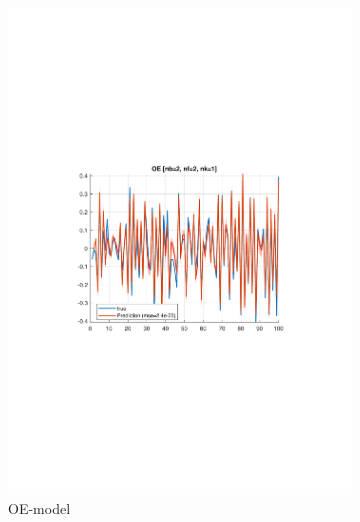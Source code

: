 \documentclass[]{article}
\begin{document}
\begin{figure}[ht]
\centering
\begin{subfigure}{.49\textwidth}
	\centering
	\includegraphics[trim= 10cm 8cm 10cm 8cm, scale=0.4]{figures/2e-OE-horizon_1.pdf}
	\caption{OE-model}
	\label{fig:2e-OE-horizon_1}
\end{subfigure}
\begin{subfigure}{.49\textwidth}
	\centering

\end{subfigure}
\end{figure}
\end{document}
